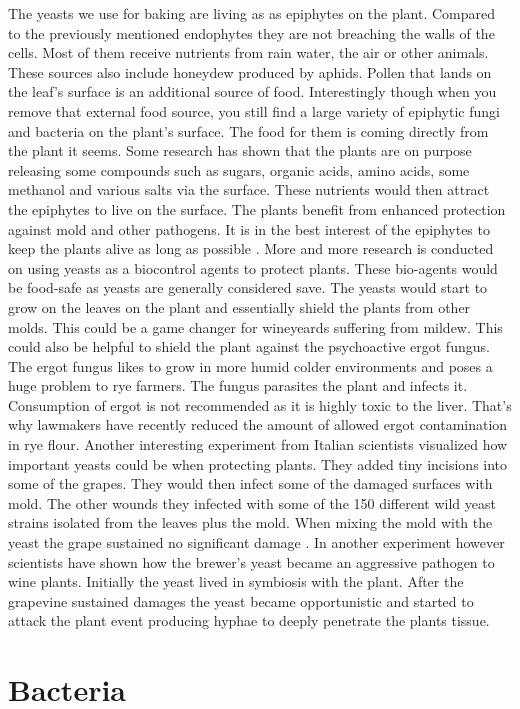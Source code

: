 The yeasts we use for baking are
living as as epiphytes on the plant. Compared to
the previously mentioned endophytes they are not
breaching the walls of the cells. Most of them
receive nutrients from rain water, the air or other animals.
These sources also include honeydew produced
by aphids. Pollen that lands on the leaf's surface
is an additional source of food. Interestingly
though when you remove that external food source,
you still find a large variety of epiphytic fungi
and bacteria on the plant's surface. The food
for them is coming directly from the plant it seems.
Some research has shown that the plants are
on purpose releasing some compounds such as sugars,
organic acids, amino acids, some methanol and various
salts via the surface. These nutrients would
then attract the epiphytes to live on the surface.
The plants benefit from enhanced protection against
mold and other pathogens. It is in the best interest
of the epiphytes to keep the plants alive
as long as possible \cite{leaf+surface+sugars+epiphytes}.
More and more research is conducted on using yeasts
as a biocontrol agents to protect plants. These bio-agents
would be food-safe as yeasts are generally considered save.
The yeasts would start to grow on the leaves on the plant
and essentially shield the plants from other molds. This
could be a game changer for wineyeards suffering from mildew.
This could also be helpful to shield the plant against the
psychoactive ergot fungus. The ergot fungus likes to grow
in more humid colder environments and poses a huge
problem to rye farmers. The fungus parasites the plant
and infects it. Consumption of ergot is not recommended
as it is highly toxic to the liver. That's why lawmakers
have recently reduced the amount of allowed ergot contamination
in rye flour. Another interesting experiment from Italian scientists
visualized how important yeasts could be when protecting
plants. They added tiny incisions into some of the grapes.
They would then infect some of the damaged surfaces with
mold. The other wounds they infected with some of the 150
different wild yeast strains isolated from the leaves plus
the mold. When mixing the mold with the yeast the grape
sustained no significant damage \cite{yeasts+biocontrol+agent}.
In another experiment however scientists have shown
how the brewer's yeast became an aggressive pathogen to wine plants.
Initially the yeast lived in symbiosis with the plant. After the grapevine
sustained damages the yeast became opportunistic and started to
attack the plant event producing hyphae to deeply
penetrate the plants tissue.

\section{Bacteria}